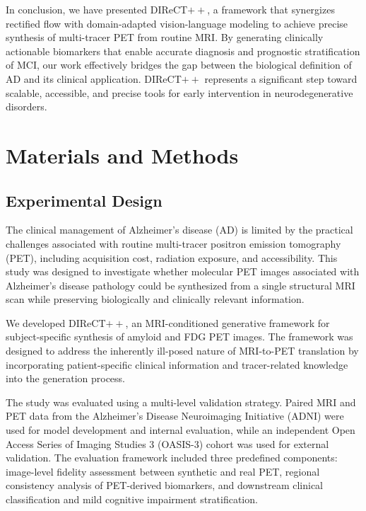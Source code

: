 \documentclass{article}
\begin{document}
In conclusion, we have presented DIReCT$++$, a framework that synergizes rectified flow with domain-adapted vision-language modeling to achieve precise synthesis of multi-tracer PET from routine MRI. By generating clinically actionable biomarkers that enable accurate diagnosis and prognostic stratification of MCI, our work effectively bridges the gap between the biological definition of AD and its clinical application. DIReCT$++$ represents a significant step toward scalable, accessible, and precise tools for early intervention in neurodegenerative disorders.



\section{Materials and Methods}
\subsection{Experimental Design}

The clinical management of Alzheimer's disease (AD) is limited by the
practical challenges associated with routine multi-tracer positron emission
tomography (PET), including acquisition cost, radiation exposure, and
accessibility. This study was designed to investigate whether molecular PET
images associated with Alzheimer's disease pathology could be synthesized
from a single structural MRI scan while preserving biologically and
clinically relevant information.

We developed DIReCT$++$, an MRI-conditioned generative framework for
subject-specific synthesis of amyloid and FDG PET images. The framework was
designed to address the inherently ill-posed nature of MRI-to-PET translation
by incorporating patient-specific clinical information and tracer-related
knowledge into the generation process.

The study was evaluated using a multi-level validation strategy. Paired MRI
and PET data from the Alzheimer's Disease Neuroimaging Initiative (ADNI) were
used for model development and internal evaluation, while an independent
Open Access Series of Imaging Studies 3 (OASIS-3) cohort was used for
external validation. The evaluation framework included three predefined
components: image-level fidelity assessment between synthetic and real PET,
regional consistency analysis of PET-derived biomarkers, and downstream
clinical classification and mild cognitive impairment stratification.
\end{document}
